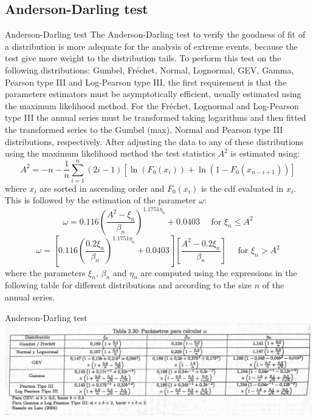\documentclass[8pt]{beamer}
\renewcommand{\emph}[1]{\textcolor{myorange}{#1}}
\begin{document}
\subsection{Anderson-Darling test}
\begin{frame}{Anderson-Darling test}
    The \alert{Anderson-Darling test} to verify the goodness of fit of a distribution is more adequate for the analysis of extreme events, because the test give more weight to the distribution tails. To perform this test on the following distributions: \emph{Gumbel}, \emph{Fr\'echet}, \emph{Normal}, \emph{Lognormal}, \emph{GEV}, \emph{Gamma}, \emph{Pearson type III} and \emph{Log-Pearson type III}, the first requirement is that the parameters estimators must be \emph{asymptotically efficient}, usually estimated using the \emph{maximum likelihood method}. For the \emph{Fr\'echet}, \emph{Lognormal} and \emph{Log-Pearson type III} the annual series must be transformed taking logarithms and then fitted the transformed series to the \emph{Gumbel (max)}, \emph{Normal} and \emph{Pearson type III} distributions, respectively. After adjusting the data to any of these distributions using the \emph{maximum likelihood method} the test statistics $A^2$ is estimated using:
    \[
        A^2 = -n - \frac{1}{n} \sum_{i=1}^n (2i-1) \left[ \ln (F_0 (x_i)) + \ln (1-F_0 (x_{n-i+1})) \right]
    \]
    where $x_i$ are sorted in ascending order and $F_0 (x_i)$ is the \emph{cdf} evaluated in $x_i$. This is followed by the estimation of the parameter $\omega$:
    \[
        \omega = 0.116 \left( \frac{A^2- \xi_n}{\beta_n} \right)^{1.1751 \eta_n} + 0.0403 \quad \text{ for } \xi_n \leq A^2
    \]
\[
    \omega = \left[ 0.116 \left( \frac{0.2 \xi_n}{\beta_n} \right)^{1.1751 \eta_n} + 0.0403 \right]\left[ \frac{A^2 - 0.2\xi_n}{\beta_n} \right] \quad \text{ for } \xi_n > A^2
    \]
    where the parameters  $\xi_n$, $\beta_n$ and $\eta_n$ are computed using the expressions in the following table for different distributions and according to the size $n$ of the annual series. 
\end{frame}

\begin{frame}{Anderson-Darling test}
\centering
\includegraphics[width=1.0\linewidth]{taM230.jpeg}  %
\end{frame}
\end{document}
